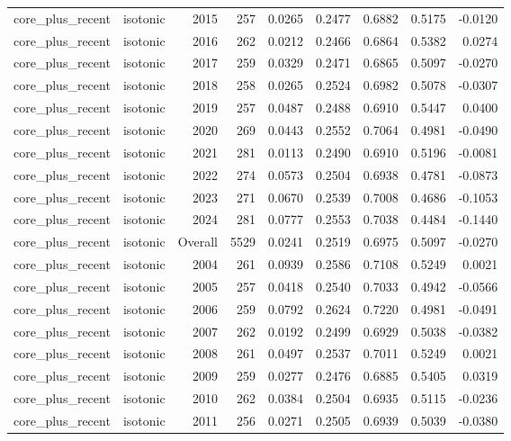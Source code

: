 \begin{table}[t]
\begin{tabular}{@{} l l r r r r r r r @{} }
      core\_plus\_recent & isotonic & 2015 & 257 & 0.0265 & 0.2477 & 0.6882 & 0.5175 & -0.0120 \\
      core\_plus\_recent & isotonic & 2016 & 262 & 0.0212 & 0.2466 & 0.6864 & 0.5382 & 0.0274 \\
      core\_plus\_recent & isotonic & 2017 & 259 & 0.0329 & 0.2471 & 0.6865 & 0.5097 & -0.0270 \\
      core\_plus\_recent & isotonic & 2018 & 258 & 0.0265 & 0.2524 & 0.6982 & 0.5078 & -0.0307 \\
      core\_plus\_recent & isotonic & 2019 & 257 & 0.0487 & 0.2488 & 0.6910 & 0.5447 & 0.0400 \\
      core\_plus\_recent & isotonic & 2020 & 269 & 0.0443 & 0.2552 & 0.7064 & 0.4981 & -0.0490 \\
      core\_plus\_recent & isotonic & 2021 & 281 & 0.0113 & 0.2490 & 0.6910 & 0.5196 & -0.0081 \\
      core\_plus\_recent & isotonic & 2022 & 274 & 0.0573 & 0.2504 & 0.6938 & 0.4781 & -0.0873 \\
      core\_plus\_recent & isotonic & 2023 & 271 & 0.0670 & 0.2539 & 0.7008 & 0.4686 & -0.1053 \\
      core\_plus\_recent & isotonic & 2024 & 281 & 0.0777 & 0.2553 & 0.7038 & 0.4484 & -0.1440 \\
      core\_plus\_recent & isotonic & Overall & 5529 & 0.0241 & 0.2519 & 0.6975 & 0.5097 & -0.0270 \\
      core\_plus\_recent & isotonic & 2004 & 261 & 0.0939 & 0.2586 & 0.7108 & 0.5249 & 0.0021 \\
      core\_plus\_recent & isotonic & 2005 & 257 & 0.0418 & 0.2540 & 0.7033 & 0.4942 & -0.0566 \\
      core\_plus\_recent & isotonic & 2006 & 259 & 0.0792 & 0.2624 & 0.7220 & 0.4981 & -0.0491 \\
      core\_plus\_recent & isotonic & 2007 & 262 & 0.0192 & 0.2499 & 0.6929 & 0.5038 & -0.0382 \\
      core\_plus\_recent & isotonic & 2008 & 261 & 0.0497 & 0.2537 & 0.7011 & 0.5249 & 0.0021 \\
      core\_plus\_recent & isotonic & 2009 & 259 & 0.0277 & 0.2476 & 0.6885 & 0.5405 & 0.0319 \\
      core\_plus\_recent & isotonic & 2010 & 262 & 0.0384 & 0.2504 & 0.6935 & 0.5115 & -0.0236 \\
      core\_plus\_recent & isotonic & 2011 & 256 & 0.0271 & 0.2505 & 0.6939 & 0.5039 & -0.0380 \\

\end{tabular}
\end{table}
